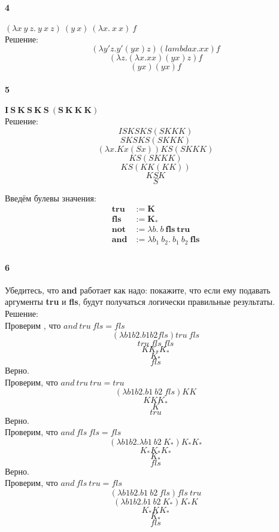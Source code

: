 \documentclass[12pt, a4paper] {article}
\begin{document}
\paragraph{4} $(\lambda x~y~z .~y~x~z)~(y~x)~(\lambda x .~x~x)~f$ \\
Решение:
	$$ (\lambda y' z. y' (yx) z)(lambda x. x x) f $$
	$$ (\lambda z. (\lambda x. xx) (y x) z) f $$
	$$ (y x) (y x) f $$

\paragraph{5} $\mathbf{I}~\mathbf{S}~\mathbf{K}~\mathbf{S}~\mathbf{K}~\mathbf{S}~(
    \mathbf{S}~\mathbf{K}~\mathbf{K}~\mathbf{K})$ \\
Решение:
 	$$ ISKSKS(SKKK) $$
 	$$ SKSKS(SKKK) $$
 	$$ (\lambda x.K x (S x))KS(SKKK) $$
 	$$ KS(SKKK) $$
 	$$ KS(KK(KK)) $$
 	$$ KSK $$
 	$$ S $$
 	
    
Введём булевы значения:
$$\begin{aligned}
\mathbf{tru} &:= \mathbf{K} \\
\mathbf{fls} &:= \mathbf{K_\ast} \\
\mathbf{not} &:= \lambda b.~b~\mathbf{fls}~\mathbf{tru} \\
\mathbf{and} &:= \lambda b_1~b_2.~b_1~b_2~\mathbf{fls} \\
\end{aligned}$$

\paragraph{6} Убедитесь, что \textbf{and} работает как надо: покажите, что если ему подавать аргументы \textbf{tru} и \textbf{fls}, будут получаться логически правильные результаты. \\
Решение: \\
 Проверим , что $ and\  tru\ fls = fls $
 $$ (\lambda b1b2. b1 b2 fls) tru\ fls $$
 $$ tru\ fls\ fls $$
 $$ K K_* K_* $$
 $$ K_* $$
 $$ fls $$
 Верно. \\
 Проверим, что $and\ tru\ tru = tru $
 $$ (\lambda b1b2. b1\ b2\ fls) K K $$
 $$ K K K_* $$
 $$ K $$
 $$ tru $$
Верно. \\
Проверим, что $ and\ fls\ fls = fls $
$$ (\lambda b1b2.\lambda b1\ b2\ K_*)K_* K_* $$
$$ K_* K_* K_* $$
$$ K_* $$
$$ fls $$
Верно. \\
Проверим, что $and\ fls\ tru = fls$
$$ (\lambda b1b2. b1\ b2\ fls)fls\ tru $$
$$ (\lambda b1b2. b1\ b2\ K_*)K_* K $$
$$ K_* K K_* $$
$$ K_* $$
$$ fls $$
\end{document}
